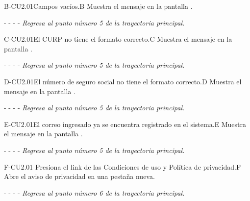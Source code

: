 	\begin{UCtrayectoriaA}{B-CU2.01}{Campos vacíos.}{B}
	    \UCpaso[\UCsist]Muestra el mensaje en la pantalla .
	    \item[- -] - - {\em Regresa al punto número 5 de la trayectoria principal.}
	\end{UCtrayectoriaA}

    
	\begin{UCtrayectoriaA}{C-CU2.01}{El CURP no tiene el formato correcto.}{C}
			\UCpaso[\UCsist] Muestra el mensaje  en la pantalla .
			\item[- -] - - {\em Regresa al punto número 5 de la trayectoria principal.} 
    \end{UCtrayectoriaA}

	\begin{UCtrayectoriaA}{D-CU2.01}{El número de seguro social no tiene el formato correcto.}{D}
			\UCpaso[\UCsist] Muestra el mensaje  en la pantalla .
			\item[- -] - - {\em Regresa al punto número 5 de la trayectoria principal.} 
    \end{UCtrayectoriaA}
    


	\begin{UCtrayectoriaA}{E-CU2.01}{El correo ingresado ya se encuentra registrado en el sistema.}{E}
		\UCpaso[\UCsist] Muestra el mensaje  en la pantalla .
		\item[- -] - - {\em Regresa al punto número 5 de la trayectoria principal.} 
	\end{UCtrayectoriaA}
	
		\begin{UCtrayectoriaA}{F-CU2.01}{ Presiona el link de las Condiciones de uso y  Política de privacidad.}{F}
		\UCpaso[\UCsist] Abre el aviso de privacidad en una pestaña nueva.
		\item[- -] - - {\em Regresa al punto número 6 de la trayectoria principal.} 
	\end{UCtrayectoriaA}
	
